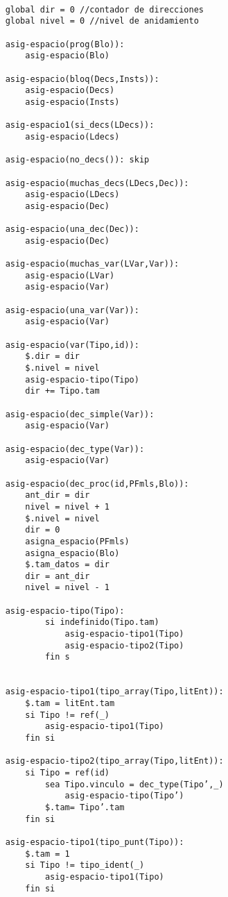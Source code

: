 \begin{lstlisting}

    global dir = 0 //contador de direcciones
    global nivel = 0 //nivel de anidamiento
    
    asig-espacio(prog(Blo)):
        asig-espacio(Blo)

    asig-espacio(bloq(Decs,Insts)):
        asig-espacio(Decs)
        asig-espacio(Insts)
    
    asig-espacio1(si_decs(LDecs)):
        asig-espacio(Ldecs)
    
    asig-espacio(no_decs()): skip
    
    asig-espacio(muchas_decs(LDecs,Dec)):
        asig-espacio(LDecs)
        asig-espacio(Dec)
    
    asig-espacio(una_dec(Dec)):
        asig-espacio(Dec)

    asig-espacio(muchas_var(LVar,Var)):
        asig-espacio(LVar)
        asig-espacio(Var)

    asig-espacio(una_var(Var)):
        asig-espacio(Var)
    
    asig-espacio(var(Tipo,id)):
        $.dir = dir
        $.nivel = nivel
        asig-espacio-tipo(Tipo)
        dir += Tipo.tam
    
    asig-espacio(dec_simple(Var)):
        asig-espacio(Var)

    asig-espacio(dec_type(Var)):
        asig-espacio(Var)
    
    asig-espacio(dec_proc(id,PFmls,Blo)):
        ant_dir = dir 
        nivel = nivel + 1
        $.nivel = nivel
        dir = 0 
        asigna_espacio(PFmls)
        asigna_espacio(Blo)
        $.tam_datos = dir 
        dir = ant_dir 
        nivel = nivel - 1 
        
    asig-espacio-tipo(Tipo):
            si indefinido(Tipo.tam) 
                asig-espacio-tipo1(Tipo) 
                asig-espacio-tipo2(Tipo)
            fin s

            
    asig-espacio-tipo1(tipo_array(Tipo,litEnt)):
        $.tam = litEnt.tam
        si Tipo != ref(_)
            asig-espacio-tipo1(Tipo)
        fin si

    asig-espacio-tipo2(tipo_array(Tipo,litEnt)):
        si Tipo = ref(id)
            sea Tipo.vinculo = dec_type(Tipo’,_)
                asig-espacio-tipo(Tipo’) 
            $.tam= Tipo’.tam
        fin si 

    asig-espacio-tipo1(tipo_punt(Tipo)):
        $.tam = 1
        si Tipo != tipo_ident(_)
            asig-espacio-tipo1(Tipo)
        fin si


\end{lstlisting}
